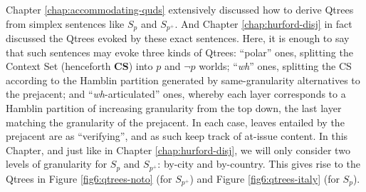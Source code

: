 Chapter \ref{chap:accommodating-quds} extensively discussed how to derive Qtrees from simplex sentences like $S_p$ and $S_{p^+}$. And Chapter \ref{chap:hurford-disj} in fact discussed the Qtrees evoked by these exact sentences. Here, it is enough to say that such sentences may evoke three kinds of Qtrees: ``polar'' ones, splitting the Context Set (henceforth \textbf{CS}) into $p$ and $\neg p$ worlds; ``\textit{wh}'' ones, splitting the CS according to the Hamblin partition generated by same-granularity alternatives to the prejacent; and ``\textit{wh}-articulated'' ones, whereby each layer corresponds to a Hamblin partition of increasing granularity from the top down, the last layer matching the granularity of the prejacent. In each case, leaves entailed by the prejacent are \setlength{\fboxsep}{1pt} as ``verifying'', and as such keep track of at-issue content. In this Chapter, and just like in Chapter \ref{chap:hurford-disj}, we will only consider two levels of granularity for $S_p$ and $S_{p^+}$: by-city and by-country. This gives rise to the Qtrees in Figure \ref{fig6:qtrees-noto} (for $S_{p^+}$) and Figure \ref{fig6:qtrees-italy} (for $S_{p}$). 

